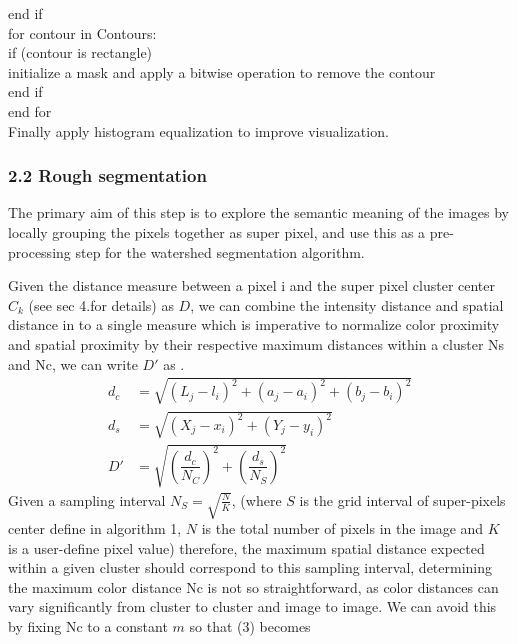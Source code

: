 \documentclass{article}
\begin{document}
\hspace{2ex}end if\\
for contour in Contours: \\
\hspace*{4ex}if (contour is rectangle)\\
\hspace*{6ex}initialize a mask and apply a bitwise operation to remove the contour\\
\hspace*{4ex}end if\\
end for\\
Finally apply histogram equalization to improve visualization.
\subsubsection*{2.2 Rough segmentation}The primary aim of this step is to explore the semantic meaning of the images by locally grouping the pixels together as super pixel, and use this as a pre-processing step for the watershed segmentation algorithm. 

Given the distance measure between a pixel i and the super pixel cluster center $C_{k}$ (see sec 4.for details) as $D$, we can combine the intensity distance and spatial distance in to a single measure which is imperative to normalize color proximity and spatial proximity by their respective maximum distances within a cluster Ns and Nc, we can write $D'$ as . \\



\begin{align}
	\label{intencity d}
	d_{c} & = \sqrt{(L_{j}-l_{i})^2 + (a_{j} - a_{i})^2 + (b_{j}-b_{i})^2}\\ 
	\label{spatial}
	d_{s} & = \sqrt{(X_{j} - x_{i})^2 + (Y_{j} - y_{i})^2}\\
	\label{distance}
	D' & = \sqrt{(\dfrac{d_{c}}{N_{C}})^2 + (\dfrac{d_{s}}{N_{S}})^2}
\end{align}
Given a sampling interval $N_{S} = \sqrt{\frac{N}{K}}$, (where $S$ is the grid interval of super-pixels center define in algorithm 1, $N$ is the total number of pixels in the image and $K$ is a user-define pixel value) therefore, the maximum spatial distance expected within a given cluster should correspond to this sampling interval, determining the maximum color distance Nc is not so straightforward, as color distances can vary significantly from cluster to cluster and image to image. We can avoid this by fixing Nc to a constant $m$ so that (3) becomes
\end{document}
